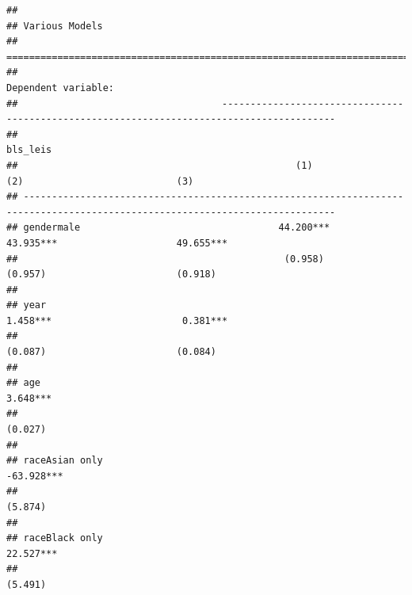 \documentclass[
]{article}
\begin{document}
\begin{verbatim}
## 
## Various Models
## =============================================================================================================================
##                                                                       Dependent variable:                                    
##                                    ------------------------------------------------------------------------------------------
##                                                                             bls_leis                                         
##                                                 (1)                           (2)                           (3)              
## -----------------------------------------------------------------------------------------------------------------------------
## gendermale                                   44.200***                     43.935***                     49.655***           
##                                               (0.958)                       (0.957)                       (0.918)            
##                                                                                                                              
## year                                                                       1.458***                       0.381***           
##                                                                             (0.087)                       (0.084)            
##                                                                                                                              
## age                                                                                                       3.648***           
##                                                                                                           (0.027)            
##                                                                                                                              
## raceAsian only                                                                                           -63.928***          
##                                                                                                           (5.874)            
##                                                                                                                              
## raceBlack only                                                                                           22.527***           
##                                                                                                           (5.491)            

\end{verbatim}
\end{document}
